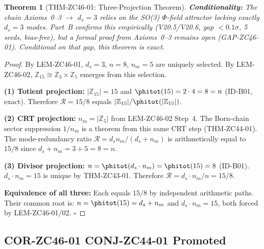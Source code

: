 \documentclass[12pt, a4paper]{article}
\newtheorem{theorem}{Theorem}[section]
\begin{document}
\begin{formalbox}[title={THM-ZC46-01: $\mathbb{Z}_{15}$
  Three-Projection Theorem (Conditional Theorem)}]
\begin{theorem}[THM-ZC46-01: Three-Projection Theorem]
\textbf{Conditionality:} The chain
Axioms~0--3 $\to$ $d_s = 3$ relies on the SO(3) $\Phi$-field
attractor locking exactly $d_s = 3$ modes.
Part~B confirms this empirically (V20.5/V20.6, gap $< 0.1\sigma$,
5 seeds, bias-free), but a formal proof from Axioms~0--3 remains
open (GAP-ZC46-01). Conditional on that gap, this theorem is
exact.
\end{theorem}

\begin{proof}
By LEM-ZC46-01, $d_s = 3$, $n = 8$, $n_m = 5$ are uniquely
selected. By LEM-ZC46-02, $\mathbb{Z}_{15} \cong
\mathbb{Z}_3 \times \mathbb{Z}_5$ emerges from this selection.

\textbf{(1) Totient projection:}
$|\mathbb{Z}_{15}| = 15$ and $\phitot(15) = 2\cdot 4 = 8 = n$
(ID-B01, exact). Therefore $\mathcal{R} = 15/8$ equals
$|\mathbb{Z}_{15}|/\phitot(|\mathbb{Z}_{15}|)$.

\textbf{(2) CRT projection:}
$n_m = |\mathbb{Z}_5|$ from LEM-ZC46-02 Step~4.
The Born-chain sector suppression $1/n_m$ is a theorem from this
same CRT step (THM-ZC44-01). The mode-redundancy ratio
$\mathcal{R} = d_s n_m/(d_s + n_m)$ is arithmetically equal
to $15/8$ since $d_s + n_m = 3 + 5 = 8 = n$.

\textbf{(3) Divisor projection:}
$n = \phitot(d_s \cdot n_m) = \phitot(15) = 8$ (ID-B01).
$d_s\cdot n_m = 15$ is unique by THM-ZC43-01.
Therefore $\mathcal{R} = d_s\cdot n_m/n = 15/8$.

\textbf{Equivalence of all three:}
Each equals $15/8$ by independent arithmetic paths.
Their common root is: $n = \phitot(15) = d_s + n_m$ and
$d_s\cdot n_m = 15$, both forced by LEM-ZC46-01/02.
\hfill$\square$
\end{proof}
\end{formalbox}

\subsection{COR-ZC46-01 \quad CONJ-ZC44-01 Promoted}

\end{document}
